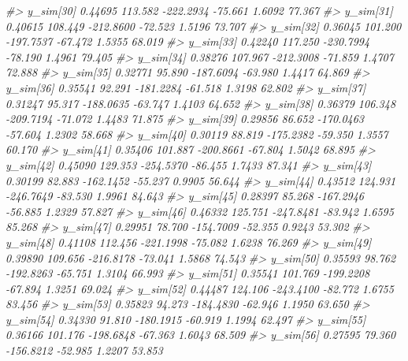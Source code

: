 \documentclass[
  10pt,
  italian,
  a4paper,
  extrafontsizes,onecolumn,openright
  ]{memoir}
\newenvironment{Shaded}{\begin{snugshade}}{\end{snugshade}}
\newcommand{\CommentTok}[1]{\textcolor[rgb]{0.56,0.35,0.01}{\textit{#1}}}
\begin{document}
\begin{Shaded}
\begin{Highlighting}[]
\CommentTok{\#\textgreater{}   y\_sim[30]   0.44695 113.582 {-}222.2934 {-}75.661  1.6092 77.367}
\CommentTok{\#\textgreater{}   y\_sim[31]   0.40615 108.449 {-}212.8600 {-}72.523  1.5196 73.707}
\CommentTok{\#\textgreater{}   y\_sim[32]   0.36045 101.200 {-}197.7537 {-}67.472  1.5355 68.019}
\CommentTok{\#\textgreater{}   y\_sim[33]   0.42240 117.250 {-}230.7994 {-}78.190  1.4961 79.405}
\CommentTok{\#\textgreater{}   y\_sim[34]   0.38276 107.967 {-}212.3008 {-}71.859  1.4707 72.888}
\CommentTok{\#\textgreater{}   y\_sim[35]   0.32771  95.890 {-}187.6094 {-}63.980  1.4417 64.869}
\CommentTok{\#\textgreater{}   y\_sim[36]   0.35541  92.291 {-}181.2284 {-}61.518  1.3198 62.802}
\CommentTok{\#\textgreater{}   y\_sim[37]   0.31247  95.317 {-}188.0635 {-}63.747  1.4103 64.652}
\CommentTok{\#\textgreater{}   y\_sim[38]   0.36379 106.348 {-}209.7194 {-}71.072  1.4483 71.875}
\CommentTok{\#\textgreater{}   y\_sim[39]   0.29856  86.652 {-}170.0463 {-}57.604  1.2302 58.668}
\CommentTok{\#\textgreater{}   y\_sim[40]   0.30119  88.819 {-}175.2382 {-}59.350  1.3557 60.170}
\CommentTok{\#\textgreater{}   y\_sim[41]   0.35406 101.887 {-}200.8661 {-}67.804  1.5042 68.895}
\CommentTok{\#\textgreater{}   y\_sim[42]   0.45090 129.353 {-}254.5370 {-}86.455  1.7433 87.341}
\CommentTok{\#\textgreater{}   y\_sim[43]   0.30199  82.883 {-}162.1452 {-}55.237  0.9905 56.644}
\CommentTok{\#\textgreater{}   y\_sim[44]   0.43512 124.931 {-}246.7649 {-}83.530  1.9961 84.643}
\CommentTok{\#\textgreater{}   y\_sim[45]   0.28397  85.268 {-}167.2946 {-}56.885  1.2329 57.827}
\CommentTok{\#\textgreater{}   y\_sim[46]   0.46332 125.751 {-}247.8481 {-}83.942  1.6595 85.268}
\CommentTok{\#\textgreater{}   y\_sim[47]   0.29951  78.700 {-}154.7009 {-}52.355  0.9243 53.302}
\CommentTok{\#\textgreater{}   y\_sim[48]   0.41108 112.456 {-}221.1998 {-}75.082  1.6238 76.269}
\CommentTok{\#\textgreater{}   y\_sim[49]   0.39890 109.656 {-}216.8178 {-}73.041  1.5868 74.543}
\CommentTok{\#\textgreater{}   y\_sim[50]   0.35593  98.762 {-}192.8263 {-}65.751  1.3104 66.993}
\CommentTok{\#\textgreater{}   y\_sim[51]   0.35541 101.769 {-}199.2208 {-}67.894  1.3251 69.024}
\CommentTok{\#\textgreater{}   y\_sim[52]   0.44487 124.106 {-}243.4100 {-}82.772  1.6755 83.456}
\CommentTok{\#\textgreater{}   y\_sim[53]   0.35823  94.273 {-}184.4830 {-}62.946  1.1950 63.650}
\CommentTok{\#\textgreater{}   y\_sim[54]   0.34330  91.810 {-}180.1915 {-}60.919  1.1994 62.497}
\CommentTok{\#\textgreater{}   y\_sim[55]   0.36166 101.176 {-}198.6848 {-}67.363  1.6043 68.509}
\CommentTok{\#\textgreater{}   y\_sim[56]   0.27595  79.360 {-}156.8212 {-}52.985  1.2207 53.853}

\end{Highlighting}
\end{Shaded}
\end{document}
